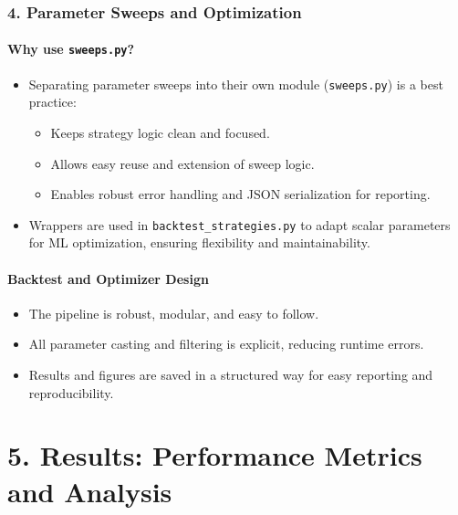 \documentclass[11pt]{article}
\providecommand{\tightlist}{%
      \setlength{\itemsep}{0pt}\setlength{\parskip}{0pt}}
\begin{document}
\subsubsection*{4. Parameter Sweeps and
Optimization}\label{parameter-sweeps-and-optimization-1}

\paragraph{\texorpdfstring{Why use
\texttt{sweeps.py}?}{Why use sweeps.py?}}\label{why-use-sweeps.py}

\begin{itemize}
\tightlist
\item
  Separating parameter sweeps into their own module (\texttt{sweeps.py})
  is a best practice:

  \begin{itemize}
  \tightlist
  \item
    Keeps strategy logic clean and focused.
  \item
    Allows easy reuse and extension of sweep logic.
  \item
    Enables robust error handling and JSON serialization for reporting.
  \end{itemize}
\item
  Wrappers are used in \texttt{backtest\_strategies.py} to adapt scalar
  parameters for ML optimization, ensuring flexibility and
  maintainability.
\end{itemize}

\paragraph{Backtest and Optimizer
Design}\label{backtest-and-optimizer-design}

\begin{itemize}
\tightlist
\item
  The pipeline is robust, modular, and easy to follow.
\item
  All parameter casting and filtering is explicit, reducing runtime
  errors.
\item
  Results and figures are saved in a structured way for easy reporting
  and reproducibility.
\end{itemize}

\section*{5. Results: Performance Metrics and Analysis}
\end{document}
